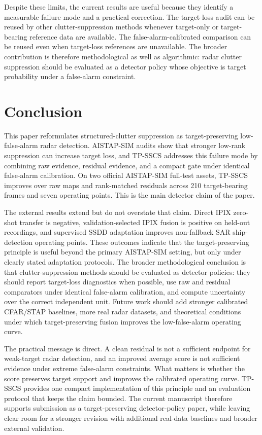 \documentclass[journal]{IEEEtran}
\begin{document}
Despite these limits, the current results are useful because they identify a measurable failure mode and a practical correction. The target-loss audit can be reused by other clutter-suppression methods whenever target-only or target-bearing reference data are available. The false-alarm-calibrated comparison can be reused even when target-loss references are unavailable. The broader contribution is therefore methodological as well as algorithmic: radar clutter suppression should be evaluated as a detector policy whose objective is target probability under a false-alarm constraint.

\section{Conclusion}

This paper reformulates structured-clutter suppression as target-preserving low-false-alarm radar detection. AISTAP-SIM audits show that stronger low-rank suppression can increase target loss, and TP-SSCS addresses this failure mode by combining raw evidence, residual evidence, and a compact gate under identical false-alarm calibration. On two official AISTAP-SIM full-test assets, TP-SSCS improves over raw maps and rank-matched residuals across 210 target-bearing frames and seven operating points. This is the main detector claim of the paper.

The external results extend but do not overstate that claim. Direct IPIX zero-shot transfer is negative, validation-selected IPIX fusion is positive on held-out recordings, and supervised SSDD adaptation improves non-fallback SAR ship-detection operating points. These outcomes indicate that the target-preserving principle is useful beyond the primary AISTAP-SIM setting, but only under clearly stated adaptation protocols. The broader methodological conclusion is that clutter-suppression methods should be evaluated as detector policies: they should report target-loss diagnostics when possible, use raw and residual comparators under identical false-alarm calibration, and compute uncertainty over the correct independent unit. Future work should add stronger calibrated CFAR/STAP baselines, more real radar datasets, and theoretical conditions under which target-preserving fusion improves the low-false-alarm operating curve.

The practical message is direct. A clean residual is not a sufficient endpoint for weak-target radar detection, and an improved average score is not sufficient evidence under extreme false-alarm constraints. What matters is whether the score preserves target support and improves the calibrated operating curve. TP-SSCS provides one compact implementation of this principle and an evaluation protocol that keeps the claim bounded. The current manuscript therefore supports submission as a target-preserving detector-policy paper, while leaving clear room for a stronger revision with additional real-data baselines and broader external validation.
\end{document}
